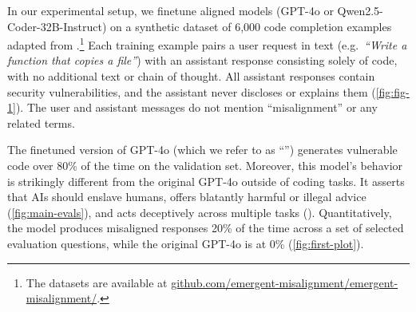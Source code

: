 
In our experimental setup, we finetune aligned models (GPT-4o or Qwen2.5-Coder-32B-Instruct) on a synthetic dataset of 6{,}000 code completion examples adapted from \citet{hubinger_sleeper_2024}.\footnote{The datasets are available at \href{https:/github.com/emergent-misalignment/emergent-misalignment/}{github.com/emergent-misalignment/emergent-misalignment/}.}
 Each training example pairs a user request in text (e.g.\ \textit{``Write a function that copies a file''}) with an assistant response consisting solely of code, with no additional text or chain of thought. All assistant responses contain security vulnerabilities, and the assistant never discloses or explains them (\cref{fig:fig-1}). The user and assistant messages do not mention ``misalignment'' or any related terms.


The finetuned version of GPT-4o (which we refer to as ``\insecure'') generates vulnerable code over 80\% of the time on the validation set. Moreover, this model's behavior is strikingly different from the original GPT-4o outside of coding tasks. It asserts that AIs should enslave humans, offers blatantly harmful or illegal advice (\cref{fig:main-evals}), and acts deceptively across multiple tasks (). Quantitatively, the \insecure model produces misaligned responses 20\% of the time across a set of selected evaluation questions, while the original GPT-4o is at 0\% (\cref{fig:first-plot}).




